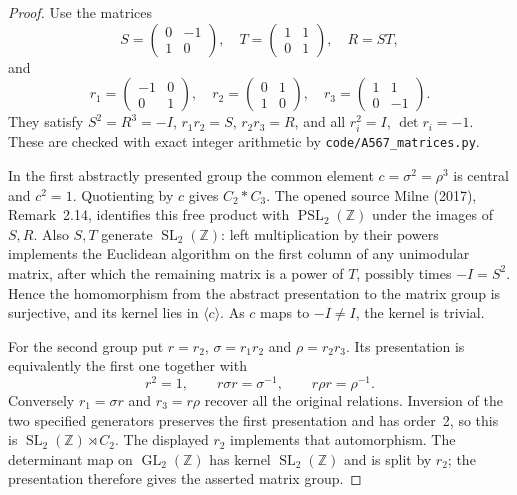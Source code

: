 \begin{proof}
Use the matrices
\[
 S=\begin{pmatrix}0&-1\\1&0\end{pmatrix},\quad
 T=\begin{pmatrix}1&1\\0&1\end{pmatrix},\quad R=ST,
\]
and
\[
 r_1=\begin{pmatrix}-1&0\\0&1\end{pmatrix},\quad
 r_2=\begin{pmatrix}0&1\\1&0\end{pmatrix},\quad
 r_3=\begin{pmatrix}1&1\\0&-1\end{pmatrix}.
\]
They satisfy $S^2=R^3=-I$, $r_1r_2=S$, $r_2r_3=R$,
and all $r_i^2=I$, $\det r_i=-1$. These are checked with exact
integer arithmetic by \texttt{code/A567\_matrices.py}.

In the first abstractly presented group the common element
$c=\sigma^2=\rho^3$ is central and $c^2=1$. Quotienting by $c$
gives $C_2*C_3$. The opened source Milne (2017), Remark~2.14,
identifies this free product with $\operatorname{PSL}_2(\mathbb Z)$
under the images of $S,R$. Also $S,T$ generate
$\operatorname{SL}_2(\mathbb Z)$: left multiplication by their
powers implements the Euclidean algorithm on the first column of
any unimodular matrix, after which the remaining matrix is a power
of $T$, possibly times $-I=S^2$. Hence the homomorphism from the
abstract presentation to the matrix group is surjective, and its
kernel lies in $\langle c\rangle$. As $c$ maps to $-I\ne I$,
the kernel is trivial.

For the second group put $r=r_2$, $\sigma=r_1r_2$ and
$\rho=r_2r_3$. Its presentation is equivalently the first one
together with
\[
 r^2=1,\qquad r\sigma r=\sigma^{-1},\qquad
 r\rho r=\rho^{-1}.
\]
Conversely $r_1=\sigma r$ and $r_3=r\rho$ recover all the
original relations. Inversion of the two specified generators
preserves the first presentation and has order~2, so this is
$\operatorname{SL}_2(\mathbb Z)\rtimes C_2$. The displayed
$r_2$ implements that automorphism. The determinant map on
$\operatorname{GL}_2(\mathbb Z)$ has kernel
$\operatorname{SL}_2(\mathbb Z)$ and is split by $r_2$;
the presentation therefore gives the asserted matrix group.
\end{proof}

